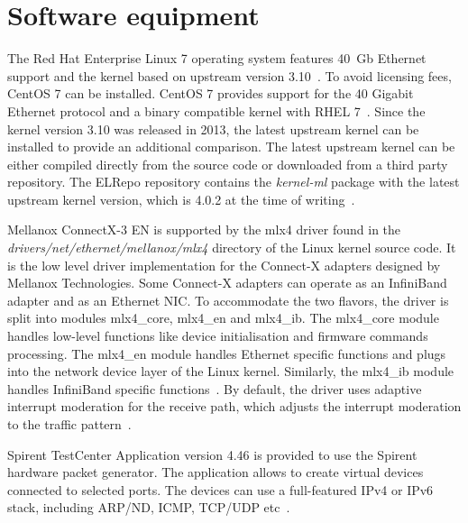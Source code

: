 
\section{Software equipment}\label{sec:analysis-software}
The Red Hat Enterprise Linux 7 operating system features 40~Gb Ethernet support and
the kernel based on upstream version 3.10~\cite{rhel-7-announce}.
To avoid licensing fees, CentOS 7 can be installed.
CentOS 7 provides support for the 40 Gigabit Ethernet protocol and a binary compatible kernel with RHEL 7~\cite{centos-7-announce}.
Since the kernel version 3.10 was released in 2013, the latest upstream kernel can be installed
to provide an additional comparison.
The latest upstream kernel can be either compiled directly from the source code or downloaded from a third party repository.
The ELRepo repository contains the {\it{kernel-ml}} package
with the latest upstream kernel version, which is 4.0.2 at the time of writing~\cite{elrepo-kernel-ml}.

Mellanox ConnectX-3 EN is supported by the mlx4 driver found in the
{\it{drivers/net/ethernet/mellanox/mlx4}} directory of the Linux kernel source code.
It is the low level driver implementation for the Connect-X adapters designed by Mellanox Technologies.
Some Connect-X adapters can operate as an InfiniBand adapter and as an Ethernet NIC.
To accommodate the two flavors, the driver is split into modules mlx4\_core, mlx4\_en and mlx4\_ib.
The mlx4\_core module handles low-level functions like device initialisation and firmware commands processing.
The mlx4\_en module handles Ethernet specific functions and
plugs into the network device layer of the Linux kernel.
Similarly, the mlx4\_ib module handles InfiniBand specific functions~\cite{mellanox-user-manual}.
By default, the driver uses adaptive interrupt moderation for the receive path,
which adjusts the interrupt moderation to the traffic pattern~\cite{mellanox-user-manual}.

Spirent TestCenter Application version 4.46 is provided to use the Spirent hardware packet generator.
The application allows to create virtual devices connected to selected ports.
The devices can use a full-featured IPv4 or IPv6 stack, including ARP/ND, ICMP, TCP/UDP etc~\cite{spirent-app}.
